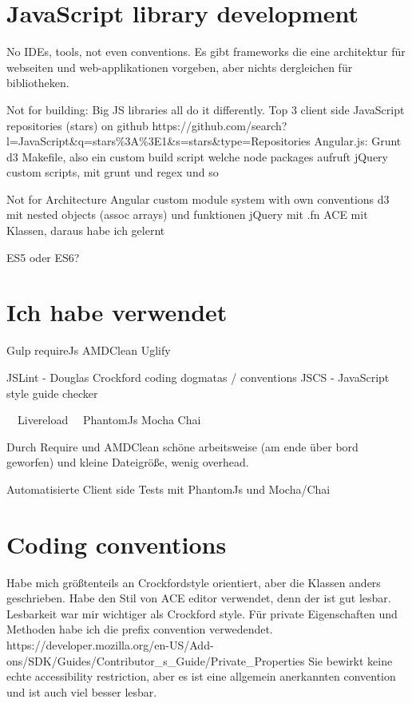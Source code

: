 
\section{JavaScript library development}


No IDEs, tools, not even conventions. Es gibt frameworks die eine architektur für webseiten und web-applikationen vorgeben, aber nichts dergleichen für bibliotheken.

Not for building:
Big JS libraries all do it differently.
Top 3 client side JavaScript repositories (stars) on github
https://github.com/search?l=JavaScript\&q=stars\%3A\%3E1\&s=stars\&type=Repositories
Angular.js: Grunt
d3 Makefile, also ein custom build script welche node packages aufruft
jQuery custom scripts, mit grunt und regex und so

Not for Architecture
Angular custom module system with own conventions
d3 mit nested objects (assoc arrays) und funktionen
jQuery mit .fn
ACE mit Klassen, daraus habe ich gelernt

ES5 oder ES6?


\section{Ich habe verwendet}

Gulp
requireJs
AMDClean
Uglify

JSLint - Douglas Crockford coding dogmatas / conventions
JSCS - JavaScript style guide checker

~~Livereload~~
PhantomJs
Mocha
Chai

Durch Require und AMDClean schöne arbeitsweise (am ende über bord geworfen) und kleine Dateigröße, wenig overhead.

Automatisierte Client side Tests mit PhantomJs und Mocha/Chai


\section{Coding conventions}

Habe mich größtenteils an Crockfordstyle orientiert, aber die Klassen anders geschrieben. Habe den Stil von ACE editor verwendet, denn der ist gut lesbar. Lesbarkeit war mir wichtiger als Crockford style. Für private Eigenschaften und Methoden habe ich die prefix convention verwedendet.
https://developer.mozilla.org/en-US/Add-ons/SDK/Guides/Contributor\_s\_Guide/Private\_Properties
Sie bewirkt keine echte accessibility restriction, aber es ist eine allgemein anerkannten convention und ist auch viel besser lesbar.

